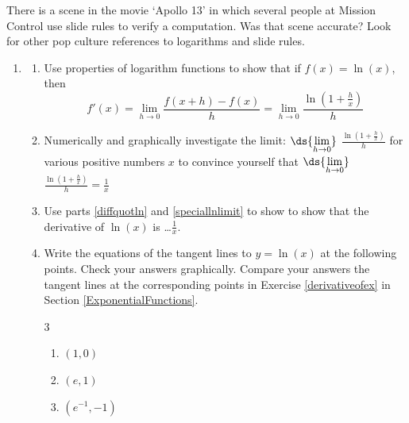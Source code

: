 \documentclass{ximera}
\begin{document}
\begin{problem}
    There is a scene in the movie `Apollo 13' in which several people at Mission Control use slide rules to verify a computation.  Was that scene accurate?  Look for other pop culture references to logarithms and slide rules.
\end{problem}

\begin{problem}
    
\begin{enumerate}
\setcounter{enumi}{\value{HW}}



\item\label{derivativeofln} \begin{enumerate}  \item\label{diffquotln}  Use properties of logarithm functions to show that if $f(x) = \ln(x)$, then \[ f'(x) = \lim_{h \rightarrow 0} \frac{f(x+h) - f(x)}{h} = \lim_{h \rightarrow 0} \frac{\ln\left( 1 + \frac{h}{x} \right)}{h} \]

\item\label{speciallnlimit}    Numerically and graphically investigate the limit: $\ds{\lim_{h \rightarrow 0}}$ $\frac{\ln\left( 1 + \frac{h}{x} \right)}{h}$ for various positive numbers $x$ to convince yourself that   $\ds{\lim_{h \rightarrow 0}}$ $\frac{\ln\left( 1 + \frac{h}{x} \right)}{h} = \frac{1}{x}$

\item  Use parts \ref{diffquotln} and \ref{speciallnlimit} to show to show that the derivative of $\ln(x)$ is \ldots  $\frac{1}{x}$.

\item  Write the equations of the tangent lines to $y = \ln(x) $ at the following points.   Check your answers graphically.  Compare your answers the tangent lines at the corresponding points in Exercise \ref{derivativeofex} in Section \ref{ExponentialFunctions}.



\begin{multicols}{3}
\begin{enumerate}

\item  $(1,0)$

\item  $(e, 1)$

\item $\left(e^{-1}, -1 \right)$

\end{enumerate}
\end{multicols}

\end{enumerate}

\setcounter{HW}{\value{enumi}}
\end{enumerate}

\end{problem}
\end{document}
